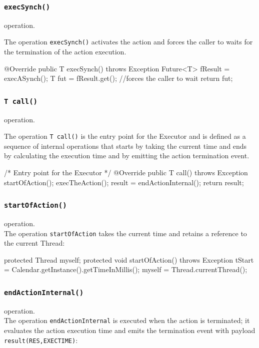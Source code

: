 \subsubsection{\texttt{execSynch()}} operation.\\

The operation \texttt{execSynch()} activates the action and forces the caller to waits for the termination of the action execution.

\begin{javacode}
	@Override
	public T execSynch() throws Exception {
		Future<T> fResult = execASynch();
		T fut = fResult.get();	//forces the caller to wait	
		return fut;	 
	}
\end{javacode}



\subsubsection{\texttt{T call()}} operation.\\

The operation \texttt{T call()} is the entry point for the Executor and is defined as a sequence of internal operations that starts by taking the current time and ends by calculating the execution time and by emitting the action termination event.

\begin{javacode}
	/* Entry point for the Executor */
	@Override
	public T call() throws Exception {
		startOfAction(); 
		execTheAction();
		result = endActionInternal();
		return result;
	}
\end{javacode}

\subsubsection{\texttt{startOfAction()}} operation.\\
The operation \texttt{startOfAction} takes the current time and retains a reference to the current Thread:
\begin{javacode}
protected Thread myself;
	protected void startOfAction() throws Exception{
		tStart = Calendar.getInstance().getTimeInMillis();
		myself = Thread.currentThread();		
	}
\end{javacode}

\subsubsection{\texttt{endActionInternal()}} operation.\\
The operation \texttt{endActionInternal} is executed when the action is terminated; it evaluates the action execution time and emits the termination event with payload \texttt{result(RES,EXECTIME)}:

